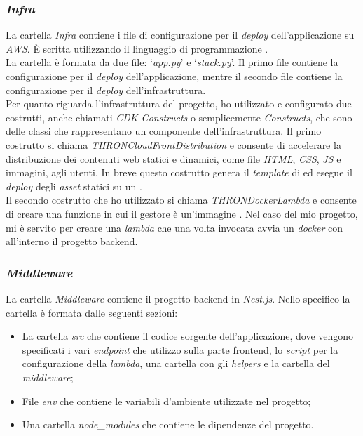 \subsubsection*{\emph{Infra}}\label{subsubsec:infra}
La cartella \textit{Infra} contiene i file di configurazione per il \textit{deploy} dell'applicazione su \textit{AWS}. È scritta utilizzando il linguaggio di programmazione .\\
La cartella è formata da due file: `\textit{app.py}' e `\textit{stack.py}'. Il primo file contiene la configurazione per il \textit{deploy} dell'applicazione, mentre il secondo file contiene la configurazione per il \textit{deploy} dell'infrastruttura.\\
Per quanto riguarda l'infrastruttura del progetto, ho utilizzato e configurato due costrutti, anche chiamati \textit{CDK Constructs} o semplicemente \textit{Constructs}, che sono delle classi che rappresentano un componente dell'infrastruttura.
Il primo costrutto si chiama \textit{THRONCloudFrontDistribution} e consente di accelerare la distribuzione dei contenuti web statici e dinamici, come file \textit{HTML}, \textit{CSS}, \textit{JS} e immagini, agli utenti.
In breve questo costrutto genera il \textit{template} di  ed esegue il \textit{deploy} degli \textit{asset} statici su un .\\
Il secondo costrutto che ho utilizzato si chiama \textit{THRONDockerLambda} e consente di creare una funzione  in cui il gestore è un'immagine .
Nel caso del mio progetto, mi è servito per creare una \textit{lambda} che una volta invocata avvia un \textit{docker} con all'interno il progetto backend.\\

\subsubsection*{\emph{Middleware}}\label{subsubsec:middleware}
La cartella \textit{Middleware} contiene il progetto backend in \textit{Nest.js}. Nello specifico la cartella è formata dalle seguenti sezioni:
\begin{itemize}
  \item La cartella \textit{src} che contiene il codice sorgente dell'applicazione, dove vengono specificati i vari \textit{endpoint} che utilizzo sulla parte frontend, lo \textit{script} per la configurazione
  della \textit{lambda}, una cartella con gli \textit{helpers} e la cartella del \textit{middleware};
  \item File \textit{env} che contiene le variabili d'ambiente utilizzate nel progetto;
  \item Una cartella \textit{node\_modules} che contiene le dipendenze del progetto.
\end{itemize}
